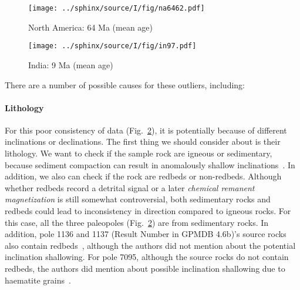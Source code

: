 \begin{figure*}[tbp]
  \captionsetup[subfigure]{labelformat=empty,aboveskip=-6pt,belowskip=-6pt}
  \centering
  \begin{subfigure}[htbp]{.49\textwidth}
    \captionsetup{skip=0pt}  %
    \centering
    \texttt{[image: ../sphinx/source/I/fig/na6462.pdf]}
    \caption{North America: 64 Ma (mean age)}\label{Fig:chap_intro_na6462agemean}
  \end{subfigure}
  \begin{subfigure}[htbp]{.49\textwidth}
    \captionsetup{skip=0pt}
    \centering
    \texttt{[image: ../sphinx/source/I/fig/in97.pdf]}
    \caption{India: 9 Ma (mean age)}\label{Fig:chap_intro_in97agemean}
  \end{subfigure}
  \caption[Example of AMP moving averaging effects]{Overlapping and further
    separated paleopoles of the NAC\@ and India. The oval ellipses are their
    95\% confidence uncertainties. The labels are their result number given in
    GPMDB 4.6b.}\label{Fig:chap_intro_ma-amp}
\end{figure*}

There are a number of possible causes for these outliers, including:

\paragraph{Lithology}

For this poor consistency of data (Fig.~\ref{Fig:chap_intro_in97agemean}), it is
potentially because of different inclinations or declinations. The first thing
we should consider about is their lithology. We want to check if the sample rock
are igneous or sedimentary, because sediment compaction can result in
anomalously shallow inclinations~\citep{T20}. In addition, we also can check if
the rock are redbeds or non-redbeds. Although whether redbeds record a detrital
signal or a later \emph{chemical remanent magnetization} is still somewhat
controversial, both sedimentary rocks and redbeds could lead to inconsistency in
direction compared to igneous rocks. For this case, all the three paleopoles
(Fig.~\ref{Fig:chap_intro_in97agemean}) are from sedimentary rocks. In addition,
pole 1136 and 1137 (Result Number in GPMDB 4.6b)'s source rocks also contain
redbeds~\citep{O82}, although the authors did not mention about the potential
inclination shallowing. For pole 7095, although the source rocks do not contain
redbeds, the authors did mention about possible inclination shallowing due to
haematite grains~\citep{G94}.

